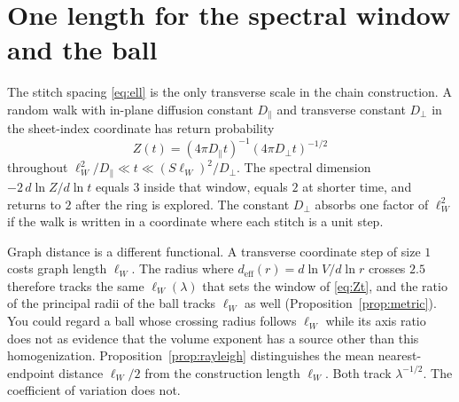 \section{One length for the spectral window and the ball}
\label{sec:h-cross}

The stitch spacing \eqref{eq:ell} is the only transverse scale in the
chain construction.
A random walk with in-plane diffusion constant \(D_\parallel\) and
transverse constant \(D_\perp\) in the sheet-index coordinate has return
probability
\begin{equation}
\label{eq:Zt}
Z(t)=(4\pi D_\parallel t)^{-1}(4\pi D_\perp t)^{-1/2}
\end{equation}
throughout
\(\ell_W^2/D_\parallel\ll t\ll (S\ell_W)^2/D_\perp\).
The spectral dimension \(-2\,d\ln Z/d\ln t\) equals \(3\) inside that
window, equals \(2\) at shorter time, and returns to \(2\) after the ring
is explored.
The constant \(D_\perp\) absorbs one factor of \(\ell_W^2\) if the walk is
written in a coordinate where each stitch is a unit step.

Graph distance is a different functional.
A transverse coordinate step of size \(1\) costs graph length \(\ell_W\).
The radius where \(d_{\mathrm{eff}}(r)=d\ln V/d\ln r\) crosses \(2.5\)
therefore tracks the same \(\ell_W(\lambda)\) that sets the window of
\eqref{eq:Zt}, and the ratio of the principal radii of the ball tracks
\(\ell_W\) as well (Proposition~\ref{prop:metric}).
You could regard a ball whose crossing radius follows \(\ell_W\) while its
axis ratio does not as evidence that the volume exponent has a source
other than this homogenization.
Proposition~\ref{prop:rayleigh} distinguishes the mean nearest-endpoint
distance \(\ell_W/2\) from the construction length \(\ell_W\).
Both track \(\lambda^{-1/2}\).
The coefficient of variation does not.
